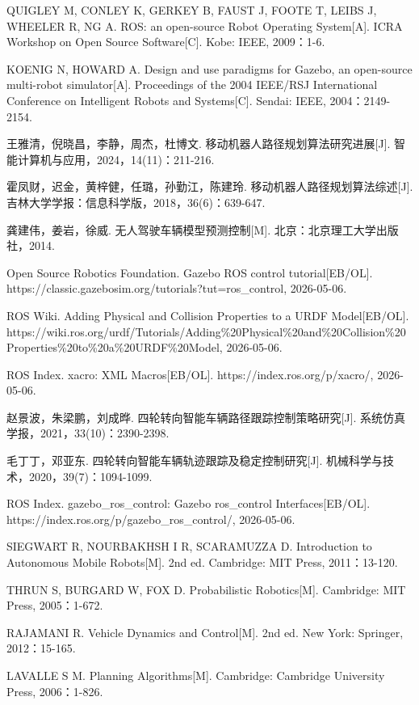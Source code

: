 \begin{enumerate}[label={[\arabic*]},leftmargin=2.2em,itemsep=0.2em]
  \item QUIGLEY M, CONLEY K, GERKEY B, FAUST J, FOOTE T, LEIBS J, WHEELER R, NG A. ROS: an open-source Robot Operating System[A]. ICRA Workshop on Open Source Software[C]. Kobe: IEEE, 2009：1-6.
  \item KOENIG N, HOWARD A. Design and use paradigms for Gazebo, an open-source multi-robot simulator[A]. Proceedings of the 2004 IEEE/RSJ International Conference on Intelligent Robots and Systems[C]. Sendai: IEEE, 2004：2149-2154.
  \item 王雅清，倪晓昌，李静，周杰，杜博文. 移动机器人路径规划算法研究进展[J]. 智能计算机与应用，2024，14(11)：211-216.
  \item 霍凤财，迟金，黄梓健，任璐，孙勤江，陈建玲. 移动机器人路径规划算法综述[J]. 吉林大学学报：信息科学版，2018，36(6)：639-647.
  \item 龚建伟，姜岩，徐威. 无人驾驶车辆模型预测控制[M]. 北京：北京理工大学出版社，2014.
  \item Open Source Robotics Foundation. Gazebo ROS control tutorial[EB/OL]. https://classic.gazebosim.org/tutorials?tut=ros\_control, 2026-05-06.
  \item ROS Wiki. Adding Physical and Collision Properties to a URDF Model[EB/OL]. https://wiki.ros.org/urdf/Tutorials/Adding\%20Physical\%20and\%20Collision\%20Properties\%20to\%20a\%20URDF\%20Model, 2026-05-06.
  \item ROS Index. xacro: XML Macros[EB/OL]. https://index.ros.org/p/xacro/, 2026-05-06.
  \item 赵景波，朱梁鹏，刘成晔. 四轮转向智能车辆路径跟踪控制策略研究[J]. 系统仿真学报，2021，33(10)：2390-2398.
  \item 毛丁丁，邓亚东. 四轮转向智能车辆轨迹跟踪及稳定控制研究[J]. 机械科学与技术，2020，39(7)：1094-1099.
  \item ROS Index. gazebo\_ros\_control: Gazebo ros\_control Interfaces[EB/OL]. https://index.ros.org/p/gazebo\_ros\_control/, 2026-05-06.
  \item SIEGWART R, NOURBAKHSH I R, SCARAMUZZA D. Introduction to Autonomous Mobile Robots[M]. 2nd ed. Cambridge: MIT Press, 2011：13-120.
  \item THRUN S, BURGARD W, FOX D. Probabilistic Robotics[M]. Cambridge: MIT Press, 2005：1-672.
  \item RAJAMANI R. Vehicle Dynamics and Control[M]. 2nd ed. New York: Springer, 2012：15-165.
  \item LAVALLE S M. Planning Algorithms[M]. Cambridge: Cambridge University Press, 2006：1-826.

\end{enumerate}
